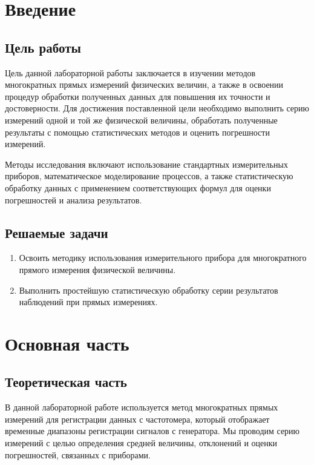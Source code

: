 

\section{Введение}


\subsection{Цель работы}

Цель данной лабораторной работы заключается в изучении методов многократных прямых измерений физических величин, а также в освоении процедур обработки полученных данных для повышения их точности и достоверности. Для достижения поставленной цели необходимо выполнить серию измерений одной и той же физической величины, обработать полученные результаты с помощью статистических методов и оценить погрешности измерений.

Методы исследования включают использование стандартных измерительных приборов, математическое моделирование процессов, а также статистическую обработку данных с применением соответствующих формул для оценки погрешностей и анализа результатов.


\subsection{Решаемые задачи}
\begin{enumerate}
  \item Освоить методику использования измерительного прибора для
многократного прямого измерения физической величины.
  \item Выполнить простейшую статистическую обработку серии
результатов наблюдений при прямых измерениях.
\end{enumerate}

\section{Основная часть}

\subsection{Теоретическая часть}

В данной лабораторной работе используется метод многократных прямых измерений для регистрации данных с частотомера, который отображает временные диапазоны регистрации сигналов с генератора. Мы проводим серию измерений с целью определения средней величины, отклонений и оценки погрешностей, связанных с приборами.


